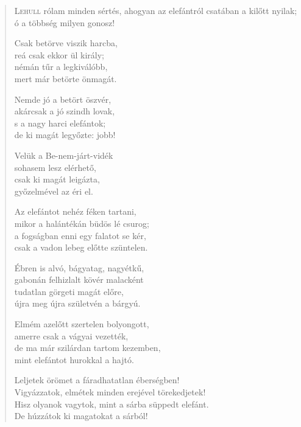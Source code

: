
\begin{verse}

{\par%
\lettrine[slope=0.5em]{L}{ehull} {\LettrineTextFont rólam minden sértés,}\newline
ahogyan az elefántról\newline
csatában a kilőtt nyilak;\verselinebreak
ó a többség milyen gonosz!
\par}

 Csak betörve viszik harcba,\\
reá csak ekkor ül király;\\
némán tűr a legkiválóbb,\\
mert már betörte önmagát.

 Nemde jó a betört öszvér,\\
akárcsak a jó szindh lovak,\\
s a nagy harci elefántok;\\
de ki magát legyőzte: jobb!

 Velük a Be-nem-járt-vidék\\
sohasem lesz elérhető,\\
csak ki magát leigázta,\\
győzelmével az éri el.

 Az elefántot nehéz féken tartani,\\
mikor a halántékán büdös lé csurog;\\
a fogságban enni egy falatot se kér,\\
csak a vadon lebeg előtte szüntelen.

 Ébren is alvó, bágyatag, nagyétkű,\\
gabonán felhizlalt kövér malacként\\
tudatlan görgeti magát előre,\\
újra meg újra születvén a bárgyú.

 Elmém azelőtt szertelen bolyongott,\\
amerre csak a vágyai vezették,\\
de ma már szilárdan tartom kezemben,\\
mint elefántot hurokkal a hajtó.

 Leljetek örömet a fáradhatatlan éberségben!\\
Vigyázzatok, elmétek minden erejével törekedjetek!\\
Hisz olyanok vagytok, mint a sárba süppedt elefánt.\\
De húzzátok ki magatokat a sárból!


\end{verse}
